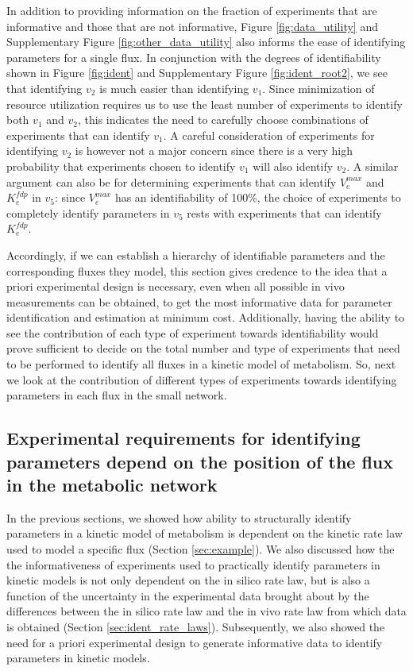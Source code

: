 \documentclass[10pt]{article}
\begin{document}
	In addition to providing information on the fraction of experiments that are informative and those that are not informative, Figure \ref{fig:data_utility} and Supplementary Figure \ref{fig:other_data_utility} also informs the ease of identifying parameters for a single flux. In conjunction with the degrees of identifiability shown in Figure \ref{fig:ident} and Supplementary Figure \ref{fig:ident_root2}, we see that identifying $v_2$ is much easier than identifying $v_1$. Since minimization of resource utilization requires us to use the least number of experiments to identify both $v_1$ and $v_2$, this indicates the need to carefully choose combinations of experiments that can identify $v_1$. A careful consideration of experiments for identifying $v_2$ is however not a major concern since there is a very high probability that experiments chosen to identify $v_1$ will also identify $v_2$. A similar argument can also be for determining experiments that can identify $V_e^{max}$ and $K_e^{fdp}$ in $v_5$: since $V_e^{max}$ has an identifiability of 100\%, the choice of experiments to completely identify parameters in $v_5$ rests with experiments that can identify $K_e^{fdp}$.
	
	Accordingly, if we can establish a hierarchy of identifiable parameters and the corresponding fluxes they model, this section gives credence to the idea that a priori experimental design is necessary, even when all possible in vivo measurements can be obtained, to get the most informative data for parameter identification and estimation at minimum cost. Additionally, having the ability to see the contribution of each type of experiment towards identifiability would prove sufficient to decide on the total number and type of experiments that need to be performed to identify all fluxes in a kinetic model of metabolism. So, next we look at the contribution of different types of experiments towards identifying parameters in each flux in the small network.
		
	\subsection{Experimental requirements for identifying parameters depend on the position of the flux in the metabolic network}\label{sec:experiment_type}	
	In the previous sections, we showed how ability to structurally identify parameters in a kinetic model of metabolism is dependent on the kinetic rate law used to model a specific flux (Section \ref{sec:example}). We also discussed how the the informativeness of experiments used to practically identify parameters in kinetic models is not only dependent on the in silico rate law, but is also a function of the uncertainty in the experimental data brought about by the differences between the in silico rate law and the in vivo rate law from which data is obtained (Section \ref{sec:ident_rate_laws}). Subsequently, we also showed the need for a priori experimental design to generate informative data to identify parameters in kinetic models.
	
\end{document}
